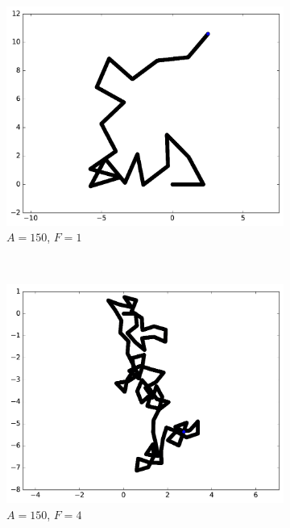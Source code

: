 \begin{figure}[htb]
\begin{subfigure}[t]{\subImgWmo}
			\centering
			\includegraphics[width=\textwidth]{figures/ch3/synTraj_219_150_1}
			\caption[$A = 150$, $F=1$]{$A = 150$, $F=1$}
			\label{fig:synTraj_219_150_1}
		\end{subfigure}
		~
		\begin{subfigure}[t]{\subImgWmo}
			\centering
			\includegraphics[width=\textwidth]{figures/ch3/synTraj_219_150_4}
			\caption[$A = 150$, $F=4$]{$A = 150$, $F=4$}
			\label{fig:synTraj_219_150_4}
		\end{subfigure}
		~
		\begin{subfigure}[t]{\subImgWmo}
			\centering

\end{subfigure}
\end{figure}
